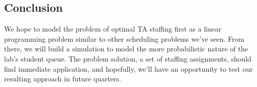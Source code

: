 \documentclass{article}
\begin{document}
\begin{multicols}{2}
\section*{Conclusion}
We hope to model the problem of optimal TA staffing first as a linear programming problem similar to other scheduling problems we've seen. From there, we will build a simulation to model the more probabilistic nature of the lab’s student queue. The problem solution, a set of staffing assignments, should find immediate application, and hopefully, we'll have an opportunity to test our resulting approach in future quarters.

\end{multicols}
\end{document}
